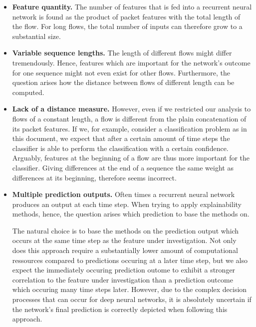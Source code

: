 \documentclass[sigconf,nonacm]{acmart}
\begin{document}
\begin{itemize}
\item
\textbf{Feature quantity.}
The number of features that is fed into a recurrent neural network is found as the product of packet features with the total length of the flow. For long flows, the total number of inputs can therefore grow to a substantial size.

\item
\textbf{Variable sequence lengths.}
The length of different flows might differ tremendously. Hence, features which are important for the network's outcome for one sequence might not even exist for other flows. Furthermore, the question arises how the distance between flows of different length can be computed.

\item
\textbf{Lack of a distance measure.}
However, even if we restricted our analysis to flows of a constant length, a flow is different from the plain concatenation of its packet features. 
If we, for example, consider a classification problem as in this document, we expect that after a certain amount of time steps the classifier is able to perform the classification with a certain confidence. Arguably, features at the beginning of a flow are thus more important for the classifier. Giving differences at the end of a sequence the same weight as differences at its beginning, therefore seems incorrect. 

\item
\textbf{Multiple prediction outputs.}
Often times a recurrent neural network produces an output at each time step. When trying to apply explainability methods, hence, the question arises which prediction to base the methods on.

The natural choice is to base the methods on the prediction output which occurs at the same time step as the feature under investigation. Not only does this approach require a substantially lower amount of computational ressources compared to predictions occuring at a later time step, but we also expect the immediately occuring prediction outome to exhibit a stronger correlation to the feature under investigation than a prediction outcome which occuring many time steps later. However, due to the complex decision processes that can occur for deep neural networks, it is absolutely  uncertain if the network's final prediction is correctly depicted when following this approach.
\end{itemize}
\end{document}
